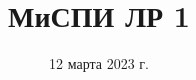 \def\projectname{Сайт АМУР.Инфо}
\def\myversion{1.0}
\def\authors{Тюрин Иван \\
            и Беляков Дмитрий}
\def\assignee{Бострикова Д. К.}
\def\assigneepost{Практик}
\date{12 марта 2023 г.}
\title{МиСПИ ЛР 1}




    
    
    \tableofcontents
    
    
    
